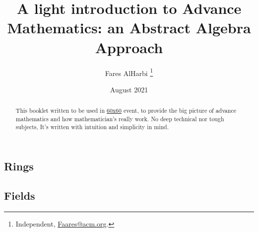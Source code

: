 \documentclass{article}
\title{A light introduction to Advance Mathematics: an Abstract Algebra Approach}
\author{Fares AlHarbi \thanks{Independent, \href{mailto:faares@acm.org}{Faares@acm.org}.}}
\date{August 2021}
\begin{document}
\maketitle
\begin{abstract}
    This booklet written to be used in \hyperlink{https://salla.sa/durba/RYePmz}{60x60} event,
    to provide the big picture of advance mathematics and how mathematician's really work.
    No deep technical nor tough subjects, It's written with intuition and simplicity in mind. 
\end{abstract}

\clearpage
\tableofcontents 




\clearpage


\clearpage

\clearpage

\clearpage

\clearpage

\clearpage

\clearpage
\subsection{Rings}

\subsection{Fields}

\clearpage
\printbibliography[heading=bibintoc]
\end{document}
